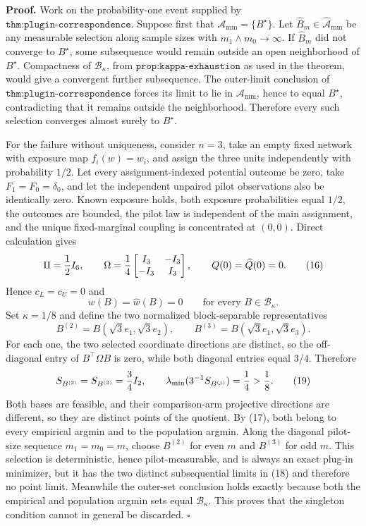 \textbf{Proof.}
Work on the probability-one event supplied by \(\texttt{thm:plugin-correspondence}\).  Suppose first that \(\mathcal A_{\mathrm{mm}}=\{B^\star\}\).  Let \(\widehat B_m\in\widehat{\mathcal A}_{\mathrm{mm}}\) be any measurable selection along sample sizes with \(m_1\wedge m_0\to\infty\).  If \(\widehat B_m\) did not converge to \(B^\star\), some subsequence would remain outside an open neighborhood of \(B^\star\).  Compactness of \(\mathcal B_\kappa\), from \(\texttt{prop:kappa-exhaustion}\) as used in the theorem, would give a convergent further subsequence.  The outer-limit conclusion of \(\texttt{thm:plugin-correspondence}\) forces its limit to lie in \(\mathcal A_{\mathrm{mm}}\), hence to equal \(B^\star\), contradicting that it remains outside the neighborhood.  Therefore every such selection converges almost surely to \(B^\star\).

For the failure without uniqueness, consider \(n=3\), take an empty fixed network with exposure map \(f_i(w)=w_i\), and assign the three units independently with probability \(1/2\).  Let every assignment-indexed potential outcome be zero, take
\(F_1=F_0=\delta_0\), and let the independent unpaired pilot observations also be identically zero.  Known exposure holds, both exposure probabilities equal \(1/2\), the outcomes are bounded, the pilot law is independent of the main assignment, and the unique fixed-marginal coupling is concentrated at \((0,0)\).  Direct calculation gives
\[
\Pi={1\over2}I_6,
\qquad
\Omega={1\over4}
\begin{bmatrix}I_3&-I_3\\-I_3&I_3\end{bmatrix},
\qquad
Q(0)=\widehat Q(0)=0.
\tag{16}
\]
Hence \(c_L=c_U=0\) and
\[
w(B)=\widehat w(B)=0
\qquad\text{for every }B\in\mathcal B_\kappa.
\tag{17}
\]
Set \(\kappa=1/8\) and define the two normalized block-separable representatives
\[
B^{(2)}=B(\sqrt3e_1,\sqrt3e_2),
\qquad
B^{(3)}=B(\sqrt3e_1,\sqrt3e_3).
\tag{18}
\]
For each one, the two selected coordinate directions are distinct, so the off-diagonal entry of \(B^{\top}\Omega B\) is zero, while both diagonal entries equal \(3/4\).  Therefore
\[
S_{B^{(2)}}=S_{B^{(3)}}={3\over4}I_2,
\qquad
\lambda_{\min}(3^{-1}S_{B^{(j)}})={1\over4}>{1\over8}.
\tag{19}
\]
Both bases are feasible, and their comparison-arm projective directions are different, so they are distinct points of the quotient.  By (17), both belong to every empirical argmin and to the population argmin.  Along the diagonal pilot-size sequence \(m_1=m_0=m\), choose \(B^{(2)}\) for even \(m\) and \(B^{(3)}\) for odd \(m\).  This selection is deterministic, hence pilot-measurable, and is always an exact plug-in minimizer, but it has the two distinct subsequential limits in (18) and therefore no point limit.  Meanwhile the outer-set conclusion holds exactly because both the empirical and population argmin sets equal \(\mathcal B_\kappa\).  This proves that the singleton condition cannot in general be discarded. \(\square\)